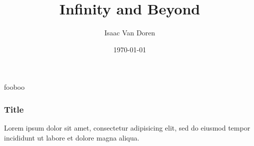 \documentclass[compress,12pt]{beamer}
\title{Infinity and Beyond}
\author{Isaac Van Doren}
\date{\today}
\begin{document}
\begin{frame}
  \titlepage
\end{frame}


fooboo

\begin{frame}
  \frametitle{Title}
  Lorem ipsum dolor sit amet, consectetur adipisicing elit, sed do eiusmod tempor incididunt ut labore et dolore magna aliqua.
\end{frame}














\end{document}
